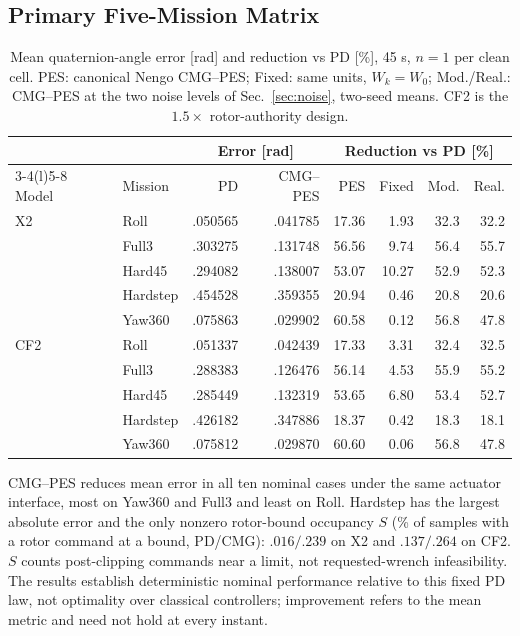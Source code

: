 \documentclass[letterpaper, 10 pt, conference]{ieeeconf}
\begin{document}
\subsection{Primary Five-Mission Matrix}
%
\begin{table}[t]
\caption{Mean quaternion-angle error [rad] and reduction vs PD [\%], 45 s,
$n=1$ per clean cell. PES: canonical Nengo CMG--PES; Fixed: same units,
$W_k=W_0$; Mod./Real.: CMG--PES at the two noise levels of
Sec.~\ref{sec:noise}, two-seed means. CF2 is the $1.5\times$
rotor-authority design.}
\label{tab:mujoco}\centering\scriptsize
\setlength{\tabcolsep}{2.4pt}
\begin{tabular}{@{}llrrrrrr@{}}
\toprule
&&\multicolumn{2}{c}{Error [rad]}&\multicolumn{4}{c}{Reduction vs PD [\%]}\\
\cmidrule(lr){3-4}\cmidrule(l){5-8}
Model&Mission&PD&CMG--PES&PES&Fixed&Mod.&Real.\\\midrule
X2&Roll&.050565&.041785&17.36&1.93&32.3&32.2\\
&Full3&.303275&.131748&56.56&9.74&56.4&55.7\\
&Hard45&.294082&.138007&53.07&10.27&52.9&52.3\\
&Hardstep&.454528&.359355&20.94&0.46&20.8&20.6\\
&Yaw360&.075863&.029902&60.58&0.12&56.8&47.8\\\midrule
CF2&Roll&.051337&.042439&17.33&3.31&32.4&32.5\\
&Full3&.288383&.126476&56.14&4.53&55.9&55.2\\
&Hard45&.285449&.132319&53.65&6.80&53.4&52.7\\
&Hardstep&.426182&.347886&18.37&0.42&18.3&18.1\\
&Yaw360&.075812&.029870&60.60&0.06&56.8&47.8\\\bottomrule
\end{tabular}
\end{table}
%
CMG--PES reduces mean error in all ten nominal cases under the same
actuator interface, most on Yaw360 and Full3 and least on Roll. Hardstep
has the largest absolute error and the only nonzero rotor-bound occupancy $S$ (\% of samples with a rotor command at a bound, PD/CMG): $.016/.239$ on X2 and $.137/.264$ on CF2. $S$ counts post-clipping commands near a limit, not
requested-wrench infeasibility. The results establish deterministic nominal
performance relative to this fixed PD law, not optimality over classical
controllers; improvement refers to the mean metric and need not hold at
every instant.
\end{document}
